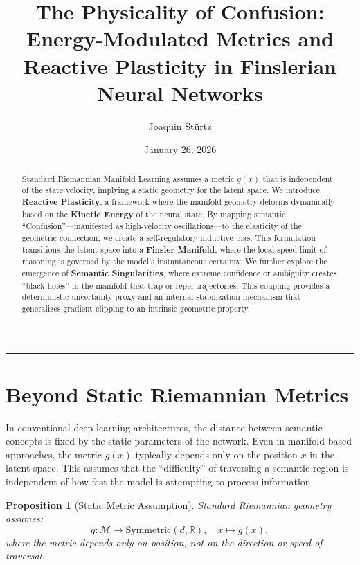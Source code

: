 \documentclass[12pt,letterpaper,twoside]{article}
\title{\textbf{The Physicality of Confusion: Energy-Modulated Metrics and Reactive Plasticity in Finslerian Neural Networks}}
\author{Joaquin Stürtz}
\date{January 26, 2026}
\newtheorem{prop}{Proposition}[section]
\newcommand{\M}{\mathcal{M}}
\begin{document}
\maketitle
\thispagestyle{empty}

\vspace{0.5cm}

\begin{abstract}
Standard Riemannian Manifold Learning assumes a metric $g(x)$ that is independent of the state velocity, implying a static geometry for the latent space. We introduce \textbf{Reactive Plasticity}, a framework where the manifold geometry deforms dynamically based on the \textbf{Kinetic Energy} of the neural state. By mapping semantic ``Confusion''---manifested as high-velocity oscillations---to the elasticity of the geometric connection, we create a self-regulatory inductive bias. This formulation transitions the latent space into a \textbf{Finsler Manifold}, where the local speed limit of reasoning is governed by the model's instantaneous certainty. We further explore the emergence of \textbf{Semantic Singularities}, where extreme confidence or ambiguity creates ``black holes'' in the manifold that trap or repel trajectories. This coupling provides a deterministic uncertainty proxy and an internal stabilization mechanism that generalizes gradient clipping to an intrinsic geometric property.
\end{abstract}

\vspace{0.5cm}
\hrule
\vspace{0.5cm}

\tableofcontents
\newpage

\section{Beyond Static Riemannian Metrics}

In conventional deep learning architectures, the distance between semantic concepts is fixed by the static parameters of the network. Even in manifold-based approaches, the metric $g(x)$ typically depends only on the position $x$ in the latent space. This assumes that the ``difficulty'' of traversing a semantic region is independent of how fast the model is attempting to process information.

\begin{prop}[Static Metric Assumption]
Standard Riemannian geometry assumes:
\[
g: \M \to \text{Symmetric}(d, \mathbb{R}), \quad x \mapsto g(x),
\]
where the metric depends only on position, not on the direction or speed of traversal.
\end{prop}
\end{document}
